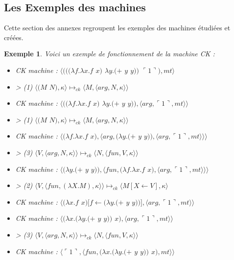 \documentclass[10pt,a4paper]{report}
\newtheorem{ex}{Exemple}
\begin{document}
	\subsection*{Les Exemples des machines}
	
	Cette section des annexes regroupent les exemples des machines étudiées et créées.
	
	\begin{ex}\label{CK} Voici un exemple de fonctionnement de la machine CK :
		\medbreak
		
		\begin{itemize}
			\item[] CK machine : $\langle(((\lambda f.\lambda x.f$ $x)$ $\lambda y.(+$ $y$ $y))$ $\ulcorner 1\urcorner),mt\rangle$
			\item[] > (1) $\langle(M$ $N),\kappa\rangle \longmapsto_{ck} \langle M,\langle arg,N,\kappa\rangle\rangle$
			\item[] CK machine : $\langle((\lambda f.\lambda x.f$ $x)$ $\lambda y.(+$ $y$ $y)),\langle arg,\ulcorner 1\urcorner,mt\rangle\rangle$
			\item[] > (1) $\langle(M$ $N),\kappa\rangle \longmapsto_{ck} \langle M,\langle arg,N,\kappa\rangle\rangle$
			\item[] CK machine : $\langle(\lambda f.\lambda x.f$ $x),\langle arg,(\lambda y.(+$ $y$ $y)),\langle arg,\ulcorner 1\urcorner,mt\rangle\rangle\rangle$	
			\item[] > (3) $\langle V,\langle arg,N,\kappa \rangle \rangle \longmapsto_{ck} \langle N,\langle fun,V,\kappa \rangle \rangle$
			\item[] CK machine : $\langle(\lambda y.(+$ $y$ $y)),\langle fun,(\lambda f.\lambda x.f$ $x),\langle arg,\ulcorner 1\urcorner,mt\rangle\rangle\rangle$	
			\item[] > (2) $\langle V,\langle fun,(\lambda X.M),\kappa \rangle \rangle \longmapsto_{ck} \langle M[X \leftarrow V],\kappa\rangle$
			\item[] CK machine : $\langle(\lambda x.f$ $x)[f\leftarrow(\lambda y.(+$ $y$ $y))],\langle arg,\ulcorner 1\urcorner,mt\rangle\rangle$	
			\item[] CK machine : $\langle(\lambda x.(\lambda y.(+$ $y$ $y))$ $x),\langle arg,\ulcorner 1\urcorner,mt\rangle\rangle$	
			\item[] > (3) $\langle V,\langle arg,N,\kappa \rangle \rangle \longmapsto_{ck} \langle N,\langle fun,V,\kappa \rangle \rangle$
			\item[] CK machine : $\langle\ulcorner 1\urcorner,\langle fun,(\lambda x.(\lambda y.(+$ $y$ $y))$ $x),mt\rangle\rangle$

\end{itemize}
\end{ex}
\end{document}
